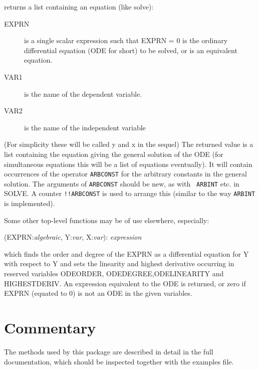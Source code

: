  returns a list containing an equation (like solve):

\begin{description}
\item[EXPRN] is a single scalar expression such that EXPRN = 0 is the
ordinary differential equation (ODE for short) to be solved,
or is an equivalent equation.
\item[VAR1] is the name of the dependent variable.
\item[VAR2] is the name of the independent variable
\end{description}

\noindent (For simplicity these will be called y and x in the sequel)
The returned value is a list containing the equation giving the
general solution of the ODE (for simultaneous equations this will be a
list of equations eventually). It will contain occurrences of the
operator {\tt ARBCONST} for the arbitrary constants in the general
solution.  The arguments of {\tt ARBCONST} should be new, as with {\tt
ARBINT} etc. in SOLVE. A counter {\tt !!ARBCONST} is used to arrange
this (similar to the way {\tt ARBINT} is implemented).

Some other top-level functions may be of use elsewhere, especially:

\vspace{.1in}
(EXPRN:{\em algebraic}, Y:{\em var}, X:{\em var}):
{\em expression}
\vspace{.1in}

\noindent which finds the order and degree of the EXPRN as a
differential equation for Y with respect to Y and sets the linearity
and highest derivative occurring in reserved variables ODEORDER,
ODEDEGREE,ODELINEARITY
and HIGHESTDERIV.  An expression equivalent to the ODE is
returned, or zero if EXPRN (equated to 0) is not an ODE in the
given variables.

\section{Commentary}

The methods used by this package are described in detail in the full
documentation, which should be inspected together with the examples
file.


